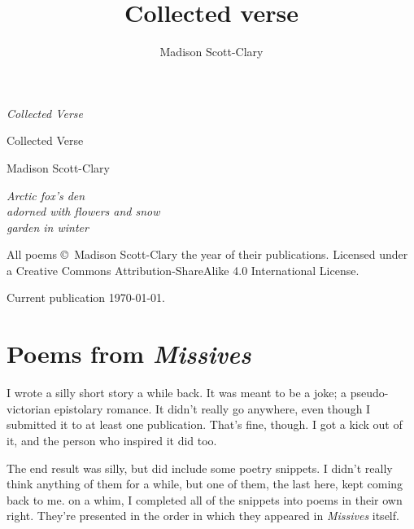 \documentclass[10pt]{memoir}
\title{Collected verse}
\author{Madison Scott-Clary}
\date{}
\begin{document}
  \frontmatter
  \pagestyle{empty}
  \null
  \vfill

  \hfill\textit{Collected Verse}

  \vfill
  \cleardoublepage
  \null
  \vfill
  \begin{raggedleft}
    {\Huge Collected Verse}

    \vspace{0.4in}

    {\Large Madison Scott-Clary}

    \vfill

    {\pfdfamily\itshape
    Arctic fox's den\\
    adorned with flowers and snow\\
    garden in winter}

  \end{raggedleft}
  \newpage
  \null
  \vfill

  {\small
  \noindent All poems \copyright\ Madison Scott-Clary the year of their publications. Licensed under a Creative Commons Attribution-ShareAlike 4.0 International License.

  \vspace{0.25in}

  \noindent Current publication \today.
  }

  \vfill
  \newpage
  \tableofcontents*
  \thispagestyle{empty}

  \mainmatter

  \onehalfspacing

  \pagestyle{fancyplain}

  \chapter{Poems from \textit{Missives}}

  I wrote a silly short story a while back. It was meant to be a joke; a pseudo-victorian epistolary romance. It didn't really go anywhere, even though I submitted it to at least one publication. That's fine, though. I got a kick out of it, and the person who inspired it did too.

  The end result was silly, but did include some poetry snippets. I didn't really think anything of them for a while, but one of them, the last here, kept coming back to me. on a whim, I completed all of the snippets into poems in their own right. They're presented in the order in which they appeared in \textit{Missives} itself.
  \thispagestyle{empty}
  \newpage

\end{document}
